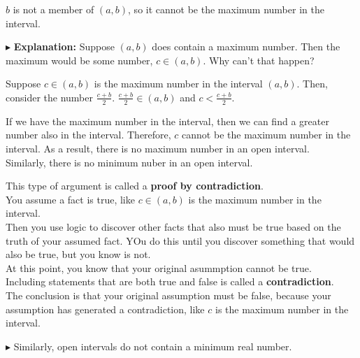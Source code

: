 \documentclass{ximera}
\begin{document}
$b$ is not a member of $(a,b)$, so it cannot be the maximum number in the interval.   


$\blacktriangleright$ \textbf{Explanation:} Suppose $(a,b)$ does contain a maximum number. Then the maximum would be some number, $c \in (a,b)$.  Why can't that happen?  


Suppose $c \in (a,b)$ is the maximum number in the interval $(a,b)$.  Then, consider the number  $\frac{c+b}{2}$.   $\frac{c+b}{2} \in (a,b)$  and $c < \frac{c+b}{2}$.  


If we have the maximum number in the interval, then we can find a greater number also in the interval. Therefore, $c$ cannot be the maximum number in the interval.  As a result, there is no maximum number in an open interval. \\

Similarly, there is no minimum nuber in an open interval. \\


\begin{paradox}

This type of argument is called a \textbf{proof by contradiction}.   \\

You assume a fact is true, like $c \in (a,b)$ is the maximum number in the interval.  \\

Then you use logic to discover other facts that also must be true based on the truth of your assumed fact.  YOu do this until you discover something that would also be true, but you know is not. \\

At this point, you know that your original asummption cannot be true. \\

Including statements that are both true and false is called a \textbf{contradiction}. \\

The conclusion is that your original assumption must be false, because your assumption has generated a contradiction, like $c$ is the maximum number in the interval.


\end{paradox}








$\blacktriangleright$ Similarly, open intervals do not contain a minimum real number. \\
\end{document}
